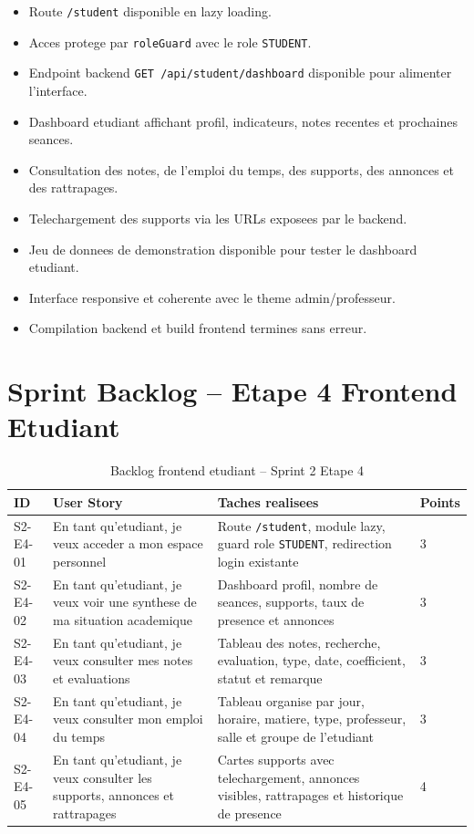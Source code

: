 \documentclass[12pt,a4paper]{report}
\begin{document}
\begin{itemize}[itemsep=0.3em]
    \item Route \texttt{/student} disponible en lazy loading.
    \item Acces protege par \texttt{roleGuard} avec le role \texttt{STUDENT}.
    \item Endpoint backend \texttt{GET /api/student/dashboard} disponible pour alimenter l'interface.
    \item Dashboard etudiant affichant profil, indicateurs, notes recentes et prochaines seances.
    \item Consultation des notes, de l'emploi du temps, des supports, des annonces et des rattrapages.
    \item Telechargement des supports via les URLs exposees par le backend.
    \item Jeu de donnees de demonstration disponible pour tester le dashboard etudiant.
    \item Interface responsive et coherente avec le theme admin/professeur.
    \item Compilation backend et build frontend termines sans erreur.
\end{itemize}

\section{Sprint Backlog -- Etape 4 Frontend Etudiant}

\begin{table}[H]
\centering
\caption{Backlog frontend etudiant -- Sprint 2 Etape 4}
\begin{tabular}{|p{1.5cm}|p{5cm}|p{5.5cm}|p{1.5cm}|}
\hline
\textbf{ID} & \textbf{User Story} & \textbf{Taches realisees} & \textbf{Points} \\
\hline
S2-E4-01 & En tant qu'etudiant, je veux acceder a mon espace personnel & Route \texttt{/student}, module lazy, guard role \texttt{STUDENT}, redirection login existante & 3 \\
\hline
S2-E4-02 & En tant qu'etudiant, je veux voir une synthese de ma situation academique & Dashboard profil, nombre de seances, supports, taux de presence et annonces & 3 \\
\hline
S2-E4-03 & En tant qu'etudiant, je veux consulter mes notes et evaluations & Tableau des notes, recherche, evaluation, type, date, coefficient, statut et remarque & 3 \\
\hline
S2-E4-04 & En tant qu'etudiant, je veux consulter mon emploi du temps & Tableau organise par jour, horaire, matiere, type, professeur, salle et groupe de l'etudiant & 3 \\
\hline
S2-E4-05 & En tant qu'etudiant, je veux consulter les supports, annonces et rattrapages & Cartes supports avec telechargement, annonces visibles, rattrapages et historique de presence & 4 \\
\hline
\end{tabular}
\end{table}
\end{document}
